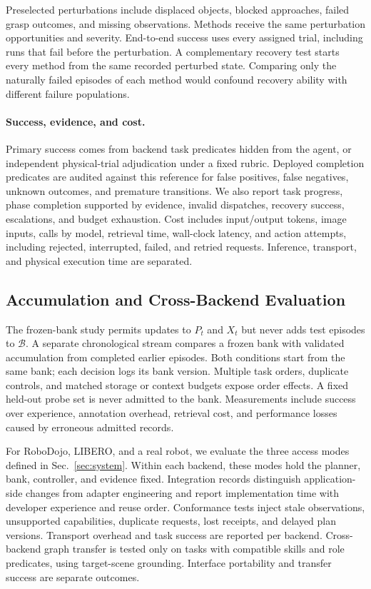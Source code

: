 \documentclass[10pt,twocolumn,letterpaper]{article}
\begin{document}
Preselected perturbations include displaced objects, blocked approaches, failed grasp outcomes, and missing observations. Methods receive the same perturbation opportunities and severity. End-to-end success uses every assigned trial, including runs that fail before the perturbation. A complementary recovery test starts every method from the same recorded perturbed state. Comparing only the naturally failed episodes of each method would confound recovery ability with different failure populations.

\paragraph{Success, evidence, and cost.}
Primary success comes from backend task predicates hidden from the agent, or independent physical-trial adjudication under a fixed rubric. Deployed completion predicates are audited against this reference for false positives, false negatives, unknown outcomes, and premature transitions. We also report task progress, phase completion supported by evidence, invalid dispatches, recovery success, escalations, and budget exhaustion. Cost includes input/output tokens, image inputs, calls by model, retrieval time, wall-clock latency, and action attempts, including rejected, interrupted, failed, and retried requests. Inference, transport, and physical execution time are separated.

\subsection{Accumulation and Cross-Backend Evaluation}

The frozen-bank study permits updates to $P_t$ and $X_t$ but never adds test episodes to $\mathcal B$. A separate chronological stream compares a frozen bank with validated accumulation from completed earlier episodes. Both conditions start from the same bank; each decision logs its bank version. Multiple task orders, duplicate controls, and matched storage or context budgets expose order effects. A fixed held-out probe set is never admitted to the bank. Measurements include success over experience, annotation overhead, retrieval cost, and performance losses caused by erroneous admitted records.

For RoboDojo, LIBERO, and a real robot, we evaluate the three access modes defined in Sec.~\ref{sec:system}. Within each backend, these modes hold the planner, bank, controller, and evidence fixed. Integration records distinguish application-side changes from adapter engineering and report implementation time with developer experience and reuse order. Conformance tests inject stale observations, unsupported capabilities, duplicate requests, lost receipts, and delayed plan versions. Transport overhead and task success are reported per backend. Cross-backend graph transfer is tested only on tasks with compatible skills and role predicates, using target-scene grounding. Interface portability and transfer success are separate outcomes.
\end{document}
